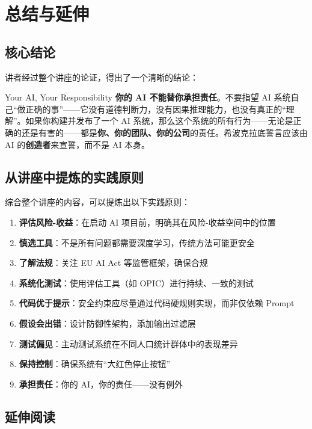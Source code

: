 \section{总结与延伸}

\subsection{核心结论}

讲者经过整个讲座的论证，得出了一个清晰的结论：

\begin{importantbox}{{Your AI, Your Responsibility}}
\textbf{你的 AI 不能替你承担责任}。不要指望 AI 系统自己``做正确的事''——它没有道德判断力，没有因果推理能力，也没有真正的``理解''。如果你构建并发布了一个 AI 系统，那么这个系统的所有行为——无论是正确的还是有害的——都是\textbf{你、你的团队、你的公司}的责任。希波克拉底誓言应该由 AI 的\textbf{创造者}来宣誓，而不是 AI 本身。
\end{importantbox}

\subsection{从讲座中提炼的实践原则}

综合整个讲座的内容，可以提炼出以下实践原则：

\begin{enumerate}
    \item \textbf{评估风险-收益}：在启动 AI 项目前，明确其在风险-收益空间中的位置
    \item \textbf{慎选工具}：不是所有问题都需要深度学习，传统方法可能更安全
    \item \textbf{了解法规}：关注 EU AI Act 等监管框架，确保合规
    \item \textbf{系统化测试}：使用评估工具（如 OPIC）进行持续、一致的测试
    \item \textbf{代码优于提示}：安全约束应尽量通过代码硬规则实现，而非仅依赖 Prompt
    \item \textbf{假设会出错}：设计防御性架构，添加输出过滤层
    \item \textbf{测试偏见}：主动测试系统在不同人口统计群体中的表现差异
    \item \textbf{保持控制}：确保系统有``大红色停止按钮''
    \item \textbf{承担责任}：你的 AI，你的责任——没有例外
\end{enumerate}

\subsection{延伸阅读}

